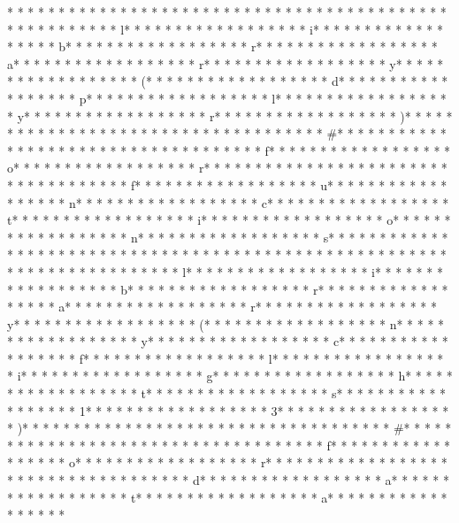 * * *  * * *  * * *  *  * * *  *  * * *  * 	* * *  * * *  * * *  *  * * *  *  * * *  * 	* * *  * * *  * * *  *  * * *  *  * * *  * l* * *  * * *  * * *  *  * * *  *  * * *  * i* * *  * * *  * * *  *  * * *  *  * * *  * b* * *  * * *  * * *  *  * * *  *  * * *  * r* * *  * * *  * * *  *  * * *  *  * * *  * a* * *  * * *  * * *  *  * * *  *  * * *  * r* * *  * * *  * * *  *  * * *  *  * * *  * y* * *  * * *  * * *  *  * * *  *  * * *  * (* * *  * * *  * * *  *  * * *  *  * * *  * d* * *  * * *  * * *  *  * * *  *  * * *  * p* * *  * * *  * * *  *  * * *  *  * * *  * l* * *  * * *  * * *  *  * * *  *  * * *  * y* * *  * * *  * * *  *  * * *  *  * * *  * r* * *  * * *  * * *  *  * * *  *  * * *  * )* * *  * * *  * * *  *  * * *  *  * * *  *  * * *  * * *  * * *  *  * * *  *  * * *  * #* * *  * * *  * * *  *  * * *  *  * * *  *  * * *  * * *  * * *  *  * * *  *  * * *  * f* * *  * * *  * * *  *  * * *  *  * * *  * o* * *  * * *  * * *  *  * * *  *  * * *  * r* * *  * * *  * * *  *  * * *  *  * * *  *  * * *  * * *  * * *  *  * * *  *  * * *  * f* * *  * * *  * * *  *  * * *  *  * * *  * u* * *  * * *  * * *  *  * * *  *  * * *  * n* * *  * * *  * * *  *  * * *  *  * * *  * c* * *  * * *  * * *  *  * * *  *  * * *  * t* * *  * * *  * * *  *  * * *  *  * * *  * i* * *  * * *  * * *  *  * * *  *  * * *  * o* * *  * * *  * * *  *  * * *  *  * * *  * n* * *  * * *  * * *  *  * * *  *  * * *  * s* * *  * * *  * * *  *  * * *  *  * * *  * 
* * *  * * *  * * *  *  * * *  *  * * *  * 	* * *  * * *  * * *  *  * * *  *  * * *  * 	* * *  * * *  * * *  *  * * *  *  * * *  * l* * *  * * *  * * *  *  * * *  *  * * *  * i* * *  * * *  * * *  *  * * *  *  * * *  * b* * *  * * *  * * *  *  * * *  *  * * *  * r* * *  * * *  * * *  *  * * *  *  * * *  * a* * *  * * *  * * *  *  * * *  *  * * *  * r* * *  * * *  * * *  *  * * *  *  * * *  * y* * *  * * *  * * *  *  * * *  *  * * *  * (* * *  * * *  * * *  *  * * *  *  * * *  * n* * *  * * *  * * *  *  * * *  *  * * *  * y* * *  * * *  * * *  *  * * *  *  * * *  * c* * *  * * *  * * *  *  * * *  *  * * *  * f* * *  * * *  * * *  *  * * *  *  * * *  * l* * *  * * *  * * *  *  * * *  *  * * *  * i* * *  * * *  * * *  *  * * *  *  * * *  * g* * *  * * *  * * *  *  * * *  *  * * *  * h* * *  * * *  * * *  *  * * *  *  * * *  * t* * *  * * *  * * *  *  * * *  *  * * *  * s* * *  * * *  * * *  *  * * *  *  * * *  * 1* * *  * * *  * * *  *  * * *  *  * * *  * 3* * *  * * *  * * *  *  * * *  *  * * *  * )* * *  * * *  * * *  *  * * *  *  * * *  *  * * *  * * *  * * *  *  * * *  *  * * *  * #* * *  * * *  * * *  *  * * *  *  * * *  *  * * *  * * *  * * *  *  * * *  *  * * *  * f* * *  * * *  * * *  *  * * *  *  * * *  * o* * *  * * *  * * *  *  * * *  *  * * *  * r* * *  * * *  * * *  *  * * *  *  * * *  *  * * *  * * *  * * *  *  * * *  *  * * *  * d* * *  * * *  * * *  *  * * *  *  * * *  * a* * *  * * *  * * *  *  * * *  *  * * *  * t* * *  * * *  * * *  *  * * *  *  * * *  * a* * *  * * *  * * *  *  * * *  *  * * *  * 
